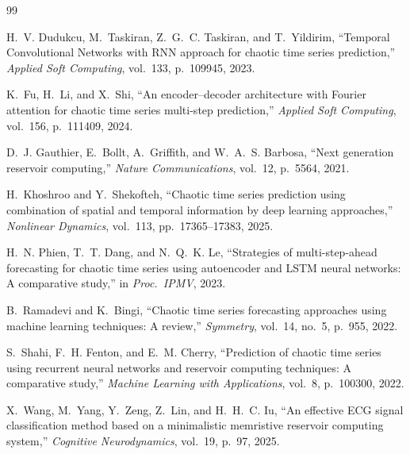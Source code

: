 \documentclass[11pt,a4paper]{article}
\begin{document}
\begin{thebibliography}{99}

H.~V. Dudukcu, M.~Taskiran, Z.~G.~C. Taskiran, and T.~Yildirim, ``Temporal Convolutional Networks with RNN approach for chaotic time series prediction,'' \emph{Applied Soft Computing}, vol.~133, p.~109945, 2023.

K.~Fu, H.~Li, and X.~Shi, ``An encoder--decoder architecture with Fourier attention for chaotic time series multi-step prediction,'' \emph{Applied Soft Computing}, vol.~156, p.~111409, 2024.

D.~J. Gauthier, E.~Bollt, A.~Griffith, and W.~A.~S. Barbosa, ``Next generation reservoir computing,'' \emph{Nature Communications}, vol.~12, p.~5564, 2021.

H.~Khoshroo and Y.~Shekofteh, ``Chaotic time series prediction using combination of spatial and temporal information by deep learning approaches,'' \emph{Nonlinear Dynamics}, vol.~113, pp.~17365--17383, 2025.

H.~N. Phien, T.~T. Dang, and N.~Q.~K. Le, ``Strategies of multi-step-ahead forecasting for chaotic time series using autoencoder and LSTM neural networks: A comparative study,'' in \emph{Proc.\ IPMV}, 2023.

B.~Ramadevi and K.~Bingi, ``Chaotic time series forecasting approaches using machine learning techniques: A review,'' \emph{Symmetry}, vol.~14, no.~5, p.~955, 2022.

S.~Shahi, F.~H. Fenton, and E.~M. Cherry, ``Prediction of chaotic time series using recurrent neural networks and reservoir computing techniques: A comparative study,'' \emph{Machine Learning with Applications}, vol.~8, p.~100300, 2022.

X.~Wang, M.~Yang, Y.~Zeng, Z.~Lin, and H.~H.~C. Iu, ``An effective ECG signal classification method based on a minimalistic memristive reservoir computing system,'' \emph{Cognitive Neurodynamics}, vol.~19, p.~97, 2025.

\end{thebibliography}
\end{document}

